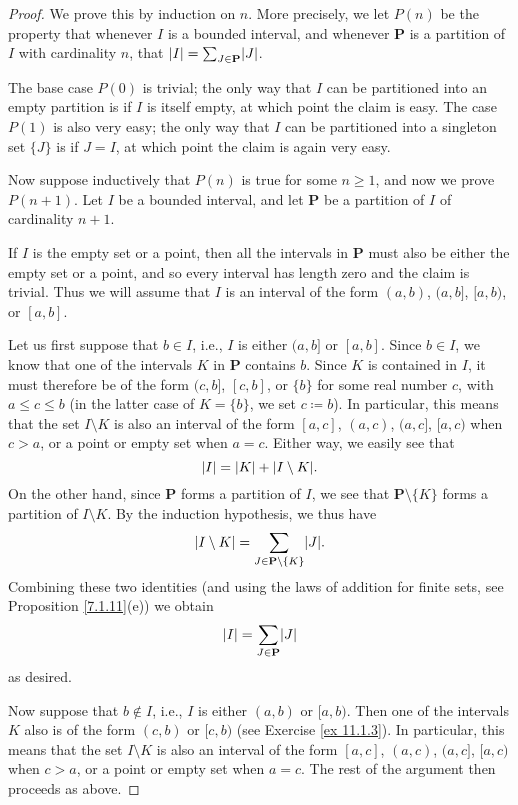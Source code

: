 \begin{proof}
    We prove this by induction on \(n\).
    More precisely, we let \(P(n)\) be the property that whenever \(I\) is a bounded interval, and whenever \(\mathbf{P}\) is a partition of \(I\) with cardinality \(n\), that \(\abs{I} = \sum_{J \in \mathbf{P}} \abs{J}\).

    The base case \(P(0)\) is trivial;
    the only way that \(I\) can be partitioned into an empty partition is if \(I\) is itself empty, at which point the claim is easy.
    The case \(P(1)\) is also very easy;
    the only way that \(I\) can be partitioned into a singleton set \(\{J\}\) is if \(J = I\), at which point the claim is again very easy.

    Now suppose inductively that \(P(n)\) is true for some \(n \geq 1\), and now we prove \(P(n + 1)\).
    Let \(I\) be a bounded interval, and let \(\mathbf{P}\) be a partition of \(I\) of cardinality \(n + 1\).

    If \(I\) is the empty set or a point, then all the intervals in \(\mathbf{P}\) must also be either the empty set or a point, and so every interval has length zero and the claim is trivial.
    Thus we will assume that \(I\) is an interval of the form \((a, b)\), \((a, b]\), \([a, b)\), or \([a, b]\).

            Let us first suppose that \(b \in I\), i.e., \(I\) is either \((a, b]\) or \([a, b]\).
    Since \(b \in I\), we know that one of the intervals \(K\) in \(\mathbf{P}\) contains \(b\).
    Since \(K\) is contained in \(I\), it must therefore be of the form \((c, b]\), \([c, b]\), or \(\{b\}\) for some real number \(c\), with \(a \leq c \leq b\) (in the latter case of \(K = \{b\}\), we set \(c \coloneqq b\)).
    In particular, this means that the set \(I \setminus K\) is also an interval of the form \([a, c]\), \((a, c)\), \((a, c]\), \([a, c)\) when \(c > a\), or a point or empty set when \(a = c\).
    Either way, we easily see that
    \[
        \abs{I} = \abs{K} + \abs{I \setminus K}.
    \]
    On the other hand, since \(\mathbf{P}\) forms a partition of \(I\), we see that \(\mathbf{P} \setminus \{K\}\) forms a partition of \(I \setminus K\).
    By the induction hypothesis, we thus have
    \[
        \abs{I \setminus K} = \sum_{J \in \mathbf{P} \setminus \{K\}} \abs{J}.
    \]
    Combining these two identities (and using the laws of addition for finite sets, see Proposition \ref{7.1.11}(e)) we obtain
    \[
        \abs{I} = \sum_{J \in \mathbf{P}} \abs{J}
    \]
    as desired.

    Now suppose that \(b \notin I\), i.e., \(I\) is either \((a, b)\) or \([a, b)\).
    Then one of the intervals \(K\) also is of the form \((c, b)\) or \([c, b)\) (see Exercise \ref{ex 11.1.3}).
            In particular, this means that the set \(I \setminus K\) is also an interval of the form \([a, c]\), \((a, c)\), \((a, c]\), \([a, c)\) when \(c > a\), or a point or empty set when \(a = c\).
    The rest of the argument then proceeds as above.
\end{proof}

